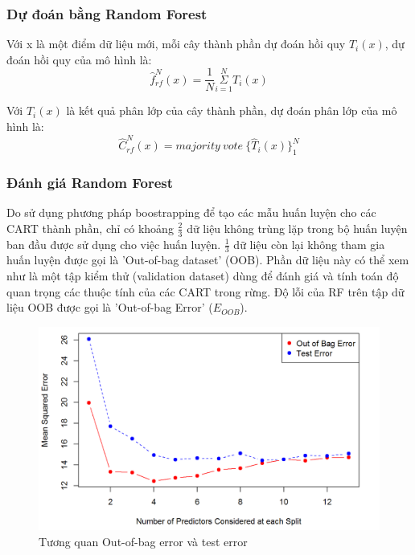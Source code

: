     \subsubsection{Dự đoán bằng Random Forest}
    
    Với x là một điểm dữ liệu mới, mỗi cây thành phần dự đoán hồi quy $T_{i}(x)$, dự đoán hồi quy của mô hình là:
    \begin{equation} \label{RF_reg}
        \hat{f}^{N}_{rf}(x) = \frac{1}{N} \underset{i=1}{ \overset{N}{\Sigma}} T_{i}(x)
    \end{equation}
    
    Với  $\hat{T}_{i}(x)$ là kết quả phân lớp của cây thành phần, dự đoán phân lớp của mô hình là:
    \begin{equation} \label{RF_cls}
        \hat{C}^{N}_{rf}(x) = majority \: vote \: \{\hat{T}_{i}(x)\}^{N}_{1}
    \end{equation}
    
    \subsubsection{Đánh giá Random Forest}
    
    Do sử dụng phương pháp boostrapping để tạo các mẫu huấn luyện cho các CART thành phần, chỉ có khoảng $\frac{2}{3}$ dữ liệu không trùng lặp trong bộ huấn luyện ban đầu được sử dụng cho việc huấn luyện. $\frac{1}{3}$ dữ liệu còn lại không tham gia huấn luyện được gọi là 'Out-of-bag dataset' (OOB). Phần dữ liệu này có thể xem như là một tập kiểm thử (validation dataset) dùng để đánh giá và tính toán độ quan trọng các thuộc tính của các CART trong rừng. Độ lỗi của RF trên tập dữ liệu OOB được gọi là 'Out-of-bag Error' ($E_{OOB}$).
    
    \begin{figure}[htp]
        \centering
        \includegraphics[width=12 cm]{images/rf_oob.png}
        \caption{Tương quan Out-of-bag error và test error}
        \label{fig:RF}
    \end{figure}
    
